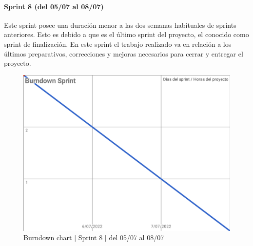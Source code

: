 \newpage
\paragraph{Sprint 8 (del 05/07 al 08/07)}
Este sprint posee una duración menor a las dos semanas habituales de sprints anteriores. Esto es debido a que es el último sprint del proyecto, el conocido como sprint de finalización. En este sprint el trabajo realizado va en relación a los últimos preparativos, correcciones y mejoras necesarios para cerrar y entregar el proyecto.
\begin{figure}[H]
    \centering
    \includegraphics[width=1\linewidth]{text/image/BurndownChart8.pdf}
    \caption{Burndown chart $|$ Sprint 8 $|$ del 05/07 al 08/07}
    \label{fig:burndown_chart_8}
\end{figure}